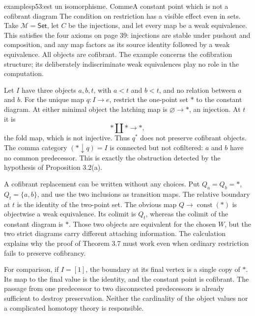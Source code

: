 \begin{dcomment}{examples}{p53:est un isomorphisme. Comme}{A constant point which is not a cofibrant diagram}
The condition on restriction has a visible effect even in sets. Take $\mathcal M=\mathsf{Set}$, let $C$ be the injections, and let every map be a weak equivalence. This satisfies the four axioms on page 39: injections are stable under pushout and composition, and any map factors as its source identity followed by a weak equivalence. All objects are cofibrant. The example concerns the cofibration structure; its deliberately indiscriminate weak equivalences play no role in the computation.

Let $I$ have three objects $a,b,t$, with $a<t$ and $b<t$, and no relation between $a$ and $b$. For the unique map $q:I\to e$, restrict the one-point set $*$ to the constant diagram. At either minimal object the latching map is $\varnothing\to *$, an injection. At $t$ it is
\[
 *\amalg *\longrightarrow *,
\]
the fold map, which is not injective. Thus $q^*$ does not preserve cofibrant objects. The comma category $(*\downarrow q)=I$ is connected but not cofiltered: $a$ and $b$ have no common predecessor. This is exactly the obstruction detected by the hypothesis of Proposition 3.2(a).

A cofibrant replacement can be written without any choices. Put $Q_a=Q_b=*$, $Q_t=\{a,b\}$, and use the two inclusions as transition maps. The relative boundary at $t$ is the identity of the two-point set. The obvious map $Q\to\operatorname{const}(*)$ is objectwise a weak equivalence. Its colimit is $Q_t$, whereas the colimit of the constant diagram is $*$. Those two objects are equivalent for the chosen $W$, but the two strict diagrams carry different attaching information. The calculation explains why the proof of Theorem 3.7 must work even when ordinary restriction fails to preserve cofibrancy.

For comparison, if $I=[1]$, the boundary at its final vertex is a single copy of $*$. Its map to the final value is the identity, and the constant point is cofibrant. The passage from one predecessor to two disconnected predecessors is already sufficient to destroy preservation. Neither the cardinality of the object values nor a complicated homotopy theory is responsible.
\end{dcomment}

